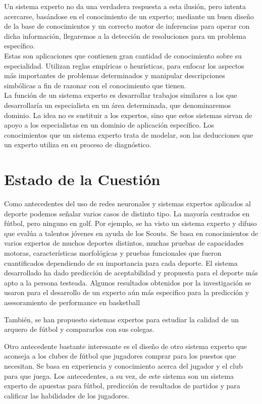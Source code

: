 \documentclass[runningheads,a4paper]{llncs}
\begin{document}
Un sistema experto no da una verdadera respuesta a esta ilusión, pero intenta acercarse, basándose en el conocimiento de un experto; mediante un buen diseño de la base de conocimientos y un correcto motor de inferencias para operar con dicha información, llegaremos a la detección de resoluciones para un problema específico.\\
Estas son aplicaciones que contienen gran cantidad de conocimiento sobre su especialidad. Utilizan reglas empíricas o heurísticas, para enfocar los aspectos más importantes de problemas determinados y manipular descripciones simbólicas a fin de razonar con el conocimiento que tienen.\cite{Samper} \\ 
La función de un sistema experto es desarrollar trabajos similares a los que desarrollaría un especialista en un área determinada, que denominaremos dominio. La idea no es sustituir a los expertos, sino que estos sistemas sirvan de apoyo a los especialistas en un dominio de aplicación específico.
Los conocimientos que un sistema experto trata de modelar, son las deducciones que un experto utiliza en su proceso de diagnóstico.\\




\section{Estado de la Cuestión}

Como antecedentes del uso de redes neuronales y sistemas expertos aplicados al deporte podemos señalar varios casos de distinto tipo. La mayoría centrados en fútbol, pero ninguno en golf.
Por ejemplo, se ha visto un sistema experto y difuso que evalúa a talentos jóvenes en ayuda de los Scouts. Se basa en conocimientos de varios expertos de muchos deportes distintos, muchas pruebas de capacidades motoras, características morfológicas y pruebas funcionales que fueron cuantificados dependiendo de su importancia para cada deporte.\cite{EC1}
El sistema desarrollado ha dado predicción de aceptabilidad y propuesta para el deporte más apto a la persona testeada. Algunos resultados obtenidos por la investigación se usaron para el desarrollo de un experto aún más especifico para la predicción y asesoramiento de performance en basketball\cite{EC2}

También, se han propuesto sistemas expertos para estudiar la calidad de un arquero de fútbol y compararlos con sus colegas.\cite{EC3}

Otro antecedente bastante interesante es el diseño de otro sistema experto que aconseja a los clubes de fútbol que jugadores comprar para los puestos que necesitan. Se basa en experiencia y conocimiento acerca del jugador y el club para que juega.\cite{EC4} Los antecedentes, a su vez, de este sistema son un sistema experto de apuestas para fútbol\cite{EC5}, predicción de resultados de partidos\cite{EC6} y para calificar las habilidades de los jugadores\cite{EC7}.
\end{document}
